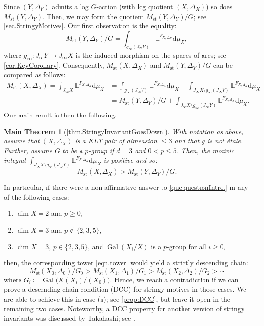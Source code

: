 \documentclass[12pt]{amsart}
\theoremstyle{plain}   %
\newtheorem*{mainthm*}{Main Theorem}
\theoremstyle{definition}    %
\theoremstyle{remark}    %
\numberwithin{equation}{theorem}
\DeclareMathOperator{\Gal}{{Gal}}
\newcommand{\bL}{\mathbb{L}}
\begin{document}
Since $(Y,\Delta_Y)$ admits a log $G$-action (with log quotient $(X,\Delta_X)$) so does $M_{\mathrm{st}}(Y,\Delta_Y)$. Then, we may form the quotient $M_{\mathrm{st}}(Y,\Delta_Y)/G$; see \autoref{sec.StringyMotives}. Our first observation is the equality:
\[
M_{\mathrm{st}}(Y,\Delta_Y)/G = \int_{g_{\infty}(J_{\infty} Y)}{\bL^{F_{X,\Delta_X}}}\mathrm{d}\mu_X ,
\]
where $g_{\infty} \colon J_{\infty} Y \to J_{\infty} X$ is the induced morphism on the spaces of arcs; see \autoref{cor.KeyCorollary}. Consequently, $M_{\mathrm{st}}(X,\Delta_X)$ and $M_{\mathrm{st}}(Y,\Delta_Y)/G $ can be compared as follows:
\begin{align*}
    M_{\mathrm{st}}(X,\Delta_X) = \int_{J_{\infty} X}{\bL^{F_{X,\Delta_X}}}\mathrm{d}\mu_X  &= \int_{g_{\infty}(J_{\infty} Y)}{\bL^{F_{X,\Delta_X}}}\mathrm{d}\mu_X  +\int_{J_{\infty} X \setminus g_{\infty}(J_{\infty} Y)}{\bL^{F_{X,\Delta_X}}}\mathrm{d}\mu_X \\
    &= M_{\mathrm{st}}(Y,\Delta_Y)/G + \int_{J_{\infty} X \setminus g_{\infty}(J_{\infty} Y)}{\bL^{F_{X,\Delta_X}}}\mathrm{d}\mu_X .
\end{align*}
Our main result is then the following.
\begin{mainthm*}[\autoref{thm.StringyInvariantGoesDown}]
With notation as above, assume that $(X,\Delta_X)$ is a KLT pair of dimension $\leq 3$ and that $g$ is not \'etale. Further, assume $G$ to be a $p$-group if $d=3$ and $0<p \leq 5$. Then, the motivic integral $\int_{J_{\infty} X \setminus g_{\infty}(J_{\infty} Y)}{\bL^{F_{X,\Delta_X}}}\mathrm{d}\mu_X $ is positive and so:
\[
 M_{\mathrm{st}}(X,\Delta_X) > M_{\mathrm{st}}(Y,\Delta_Y)/G.
\]
\end{mainthm*}

In particular, if there were a non-affirmative answer to \autoref{que.questionIntro.} in any of the following cases:
\begin{enumerate}
    \item $\dim X = 2$ and $p \geq0$,
    \item $\dim X = 3$ and $p \notin \{2,3,5\}$, 
    \item $\dim X =3$, $p \in \{2,3,5\}$, and $\Gal(X_i/X)$ is a $p$-group for all $i \geq 0$,
\end{enumerate}
then, the corresponding tower \autoref{eqn.tower} would yield a strictly descending chain:
\[
M_{\mathrm{st}}(X_0, \Delta_0)/G_0 > M_{\mathrm{st}}(X_1, \Delta_1)/G_1 > M_{\mathrm{st}}(X_2, \Delta_2)/G_2 > \cdots
\]
where $G_i \coloneqq \Gal\big(K(X_i)/(X_0)\big)$. Hence, we reach a contradiction if we can prove a descending chain condition (DCC) for stringy motives in those cases. We are able to achieve this in case (a); see \autoref{prop:DCC}, but leave it open in the remaining two cases. Noteworthy, a DCC property for another version of stringy invariants was discussed by Takahashi; see \cite{TakahashiDCCStringyInvariants}. 
\end{document}
